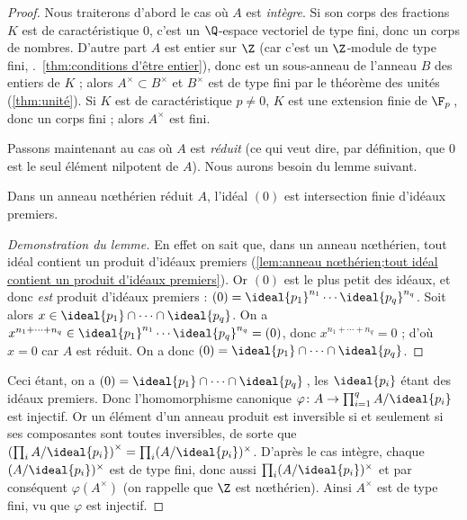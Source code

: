 \documentclass[11pt, %
  title in boldface,
  theorem in new line,
  theorem numbering = section,
  number theorems separately,
  simple name,
]{beaulivre}
\begin{document}
    \begin{proof}
        Nous traiterons d'abord le cas où \( A \) est \emph{intègre}. Si son corps des fractions \( K \) est de caractéristique \( 0 \), c'est un \( \Q \)‑espace vectoriel de type fini, donc un corps de nombres. D'autre part \( A \) est entier sur \( \Z \) (car c'est un \( \Z \)‑module de type fini, \cf.~\cref{thm:conditions d'être entier}), donc est un sous-anneau de l'anneau \( B \) des entiers de \( K \) ; alors \( A^\times \subset B^\times \) et \( B^\times \) est de type fini par le théorème des unités (\cref{thm:unité}). Si \( K \) est de caractéristique \( p \neq 0 \), \( K \) est une extension finie de \( \F_p \)\,, donc un corps fini ; alors \( A^\times \) est fini.

        Passons maintenant au cas où \( A \) est \emph{réduit} (ce qui veut dire, par définition, que \( 0 \) est le seul élément nilpotent de \( A \)). Nous aurons besoin du lemme suivant.

        \begin{lemma*}
            Dans un anneau nœthérien réduit \( A \), l'idéal \( (0) \) est intersection finie d'idéaux \mbox{premiers}.
        \end{lemma*}
        \begin{proof}[Demonstration du lemme]
            En effet on sait que, dans un anneau nœthérien, tout idéal contient un produit d'idéaux premiers (\cref{lem:anneau nœthérien;tout idéal contient un produit d'idéaux premiers}). Or \( (0) \) est le plus petit des idéaux, et donc \emph{est} produit d'idéaux premiers : \( (0) = \ideal{p_1}^{n_1} \cdots \ideal{p_q}^{n_q} \). Soit alors \( x \in \ideal{p_1} \cap \cdots \cap \ideal{p_q} \). On a \( x^{n_1 + \cdots + n_q} \in \ideal{p_1}^{n_1} \cdots \ideal{p_q}^{n_q} = (0) \), donc \( x^{n_1 + \cdots + n_q} = 0 \) ; d'où \( x = 0 \) car \( A \) est réduit. On a donc \( (0) = \ideal{p_1} \cap \cdots \cap \ideal{p_q} \).
        \end{proof}

        Ceci étant, on a \( (0) = \ideal{p_1} \cap \cdots \cap \ideal{p_q} \)\,, les \( \ideal{p_i} \) étant des idéaux premiers. Donc l'homomorphisme canonique \( \varphi \colon A \to \prod_{i=1}^q A/\ideal{p_i} \) est injectif. Or un élément d'un anneau produit est inversible si et seulement si ses composantes sont toutes inversibles, de sorte que \( \left(\prod_i A/\ideal{p_i}\right)^\times = \prod_i (A/\ideal{p_i})^\times \). D'après le cas intègre, chaque \( (A/\ideal{p_i})^\times \) est de type fini, donc aussi \( \prod_i (A/\ideal{p_i})^\times \) et par conséquent \( \varphi(A^\times) \) (on rappelle que \( \Z \) est nœthérien). Ainsi \( A^\times \) est de type fini, vu que \( \varphi \) est injectif.


\end{proof}
\end{document}
